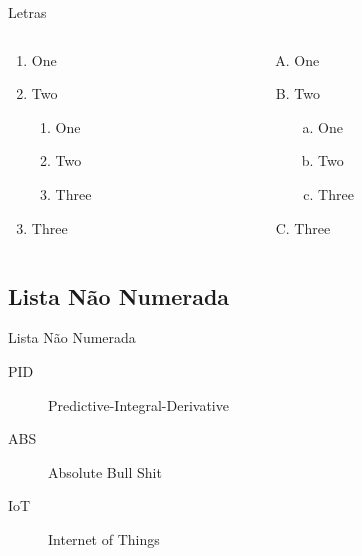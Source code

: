 \begin{slide}{Letras}
  \begin{columns}[T]
    \begin{column}{0.48\textwidth}
      \begin{enumerate}[A]
        \item One
        \item Two
              \begin{enumerate}[a]
                \item One
                \item Two
                \item Three
              \end{enumerate}
        \item Three
      \end{enumerate}
    \end{column}%
    \hfill%
    \begin{column}{0.48\textwidth}
      \begin{enumerate}[(A)]
        \item One
        \item Two
              \begin{enumerate}[(a)]
                \item One
                \item Two
                \item Three
              \end{enumerate}
        \item Three
      \end{enumerate}
    \end{column}%
  \end{columns}
\end{slide}

\subsection{Lista Não Numerada}

\begin{slide}{Lista Não Numerada}
  \begin{description}
    \item[PID] Predictive-Integral-Derivative
    \item[ABS] Absolute Bull Shit
    \item[IoT] Internet of Things
  \end{description}
\end{slide}
